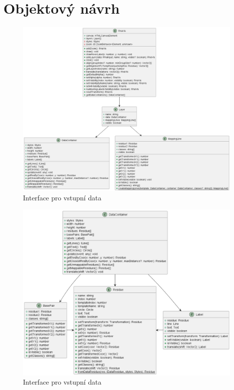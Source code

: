 \section{Objektový návrh}

\begin{figure}[H]
  \centering
  \includegraphics[width=145mm]{../img/rnaVis.png}
  \caption{Interface pro vstupní data}
\end{figure}

\begin{figure}[H]
  \centering
  \includegraphics[width=145mm]{../img/dataContainer.png}
  \caption{Interface pro vstupní data}
\end{figure}

